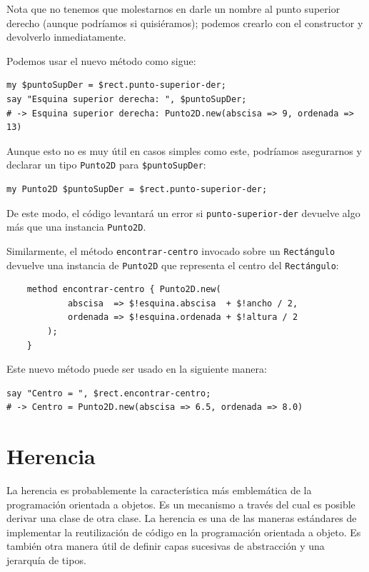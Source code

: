 Nota que no tenemos que molestarnos en darle un nombre al
punto superior derecho (aunque podríamos si quisiéramos);
podemos crearlo con el constructor y devolverlo inmediatamente.

Podemos usar el nuevo método como sigue:

\begin{verbatim}
my $puntoSupDer = $rect.punto-superior-der;
say "Esquina superior derecha: ", $puntoSupDer;
# -> Esquina superior derecha: Punto2D.new(abscisa => 9, ordenada => 13)
\end{verbatim}

Aunque esto no es muy útil en casos simples como este, 
podríamos asegurarnos y declarar un tipo {\tt Punto2D}
para \verb|$puntoSupDer|:

\begin{verbatim}
my Punto2D $puntoSupDer = $rect.punto-superior-der;
\end{verbatim} 

De este modo, el código levantará un error si {\tt punto-superior-der}
devuelve algo más que una instancia {\tt Punto2D}.

Similarmente, el método \verb|encontrar-centro| invocado 
sobre un {\tt Rectángulo} devuelve una instancia de 
{\tt Punto2D} que representa el centro del {\tt Rectángulo}:

\begin{verbatim}
    method encontrar-centro { Punto2D.new(
            abscisa  => $!esquina.abscisa  + $!ancho / 2, 
            ordenada => $!esquina.ordenada + $!altura / 2
        );
    }
\end{verbatim}
%
Este nuevo método puede ser usado en la siguiente manera:

\begin{verbatim}
say "Centro = ", $rect.encontrar-centro;
# -> Centro = Punto2D.new(abscisa => 6.5, ordenada => 8.0)
\end{verbatim}
%

\section{Herencia}

La herencia es probablemente la característica más 
emblemática de la programación orientada a objetos.
Es un mecanismo a través del cual es posible derivar una
clase de otra clase. La herencia es una de las maneras 
estándares de implementar la reutilización de código en la
programación orientada a objeto. Es también otra manera útil 
de definir capas sucesivas de abstracción y una 
jerarquía de tipos.

